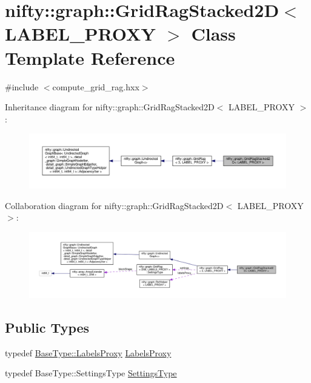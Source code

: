 \hypertarget{classnifty_1_1graph_1_1GridRagStacked2D}{}\section{nifty\+:\+:graph\+:\+:Grid\+Rag\+Stacked2\+D$<$ L\+A\+B\+E\+L\+\_\+\+P\+R\+O\+X\+Y $>$ Class Template Reference}
\label{classnifty_1_1graph_1_1GridRagStacked2D}


{\ttfamily \#include $<$compute\+\_\+grid\+\_\+rag.\+hxx$>$}



Inheritance diagram for nifty\+:\+:graph\+:\+:Grid\+Rag\+Stacked2\+D$<$ L\+A\+B\+E\+L\+\_\+\+P\+R\+O\+X\+Y $>$\+:\nopagebreak
\begin{figure}[H]
\begin{center}
\leavevmode
\includegraphics[width=350pt]{classnifty_1_1graph_1_1GridRagStacked2D__inherit__graph}
\end{center}
\end{figure}


Collaboration diagram for nifty\+:\+:graph\+:\+:Grid\+Rag\+Stacked2\+D$<$ L\+A\+B\+E\+L\+\_\+\+P\+R\+O\+X\+Y $>$\+:\nopagebreak
\begin{figure}[H]
\begin{center}
\leavevmode
\includegraphics[width=350pt]{classnifty_1_1graph_1_1GridRagStacked2D__coll__graph}
\end{center}
\end{figure}
\subsection*{Public Types}
\begin{DoxyCompactItemize}
\item 
typedef \hyperlink{classnifty_1_1graph_1_1GridRag_ad3146f72301da4f45b51e3b692776cf1}{Base\+Type\+::\+Labels\+Proxy} \hyperlink{classnifty_1_1graph_1_1GridRagStacked2D_a09b44c819b97274a1025dc68cb6b3dc9}{Labels\+Proxy}
\item 
typedef Base\+Type\+::\+Settings\+Type \hyperlink{classnifty_1_1graph_1_1GridRagStacked2D_abc778dc9bd7c20bacba215c1fc64ffb5}{Settings\+Type}
\end{DoxyCompactItemize}
